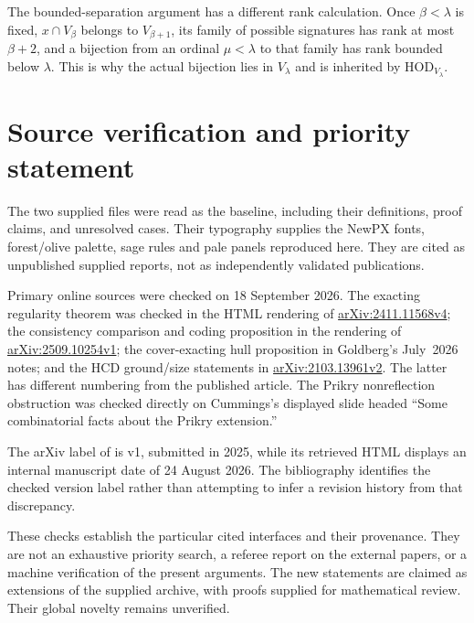 \documentclass[11pt,letterpaper]{article}
\theoremstyle{definition}
\numberwithin{equation}{section}
\newcommand{\HOD}{\mathrm{HOD}}
\newcommand{\arxiv}[1]{\href{https://arxiv.org/abs/#1}{arXiv:#1}}
\begin{document}
The bounded-separation argument has a different rank calculation. Once $\beta<\lambda$ is fixed, $x\cap V_\beta$ belongs to $V_{\beta+1}$, its family of possible signatures has rank at most $\beta+2$, and a bijection from an ordinal $\mu<\lambda$ to that family has rank bounded below $\lambda$. This is why the actual bijection lies in $V_\lambda$ and is inherited by $\HOD_{V_\lambda}$.

\section{Source verification and priority statement}\label{sec:sources}

The two supplied files were read as the baseline, including their definitions, proof claims, and unresolved cases. Their typography supplies the NewPX fonts, forest/olive palette, sage rules and pale panels reproduced here. They are cited as unpublished supplied reports, not as independently validated publications.

Primary online sources were checked on 18 September 2026. The exacting regularity theorem was checked in the HTML rendering of \arxiv{2411.11568v4}; the consistency comparison and coding proposition in the rendering of \arxiv{2509.10254v1}; the cover-exacting hull proposition in Goldberg's July~2026 notes; and the HCD ground/size statements in \arxiv{2103.13961v2}. The latter has different numbering from the published article. The Prikry nonreflection obstruction was checked directly on Cummings's displayed slide headed ``Some combinatorial facts about the Prikry extension.''

The arXiv label of \cite{abgl} is v1, submitted in 2025, while its retrieved HTML displays an internal manuscript date of 24 August 2026. The bibliography identifies the checked version label rather than attempting to infer a revision history from that discrepancy.

These checks establish the particular cited interfaces and their provenance. They are not an exhaustive priority search, a referee report on the external papers, or a machine verification of the present arguments. The new statements are claimed as extensions of the supplied archive, with proofs supplied for mathematical review. Their global novelty remains unverified.
\end{document}
